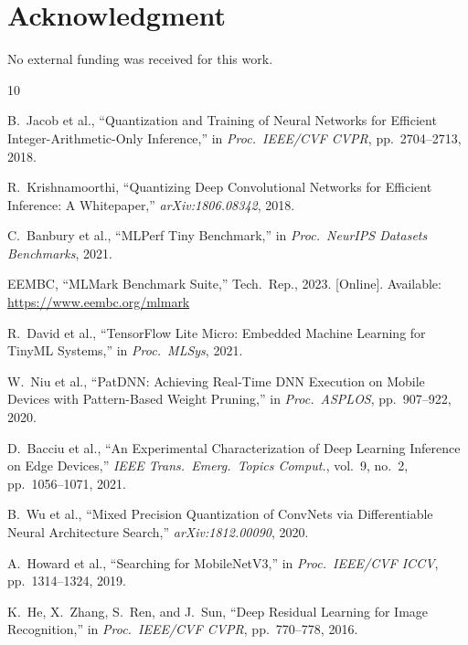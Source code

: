 \documentclass[journal]{IEEEtran}
\begin{document}
\section*{Acknowledgment}

No external funding was received for this work.

\begin{thebibliography}{10}

B.~Jacob et al., ``Quantization and Training of Neural Networks for Efficient Integer-Arithmetic-Only Inference,'' in \emph{Proc.\ IEEE/CVF CVPR}, pp.~2704--2713, 2018.

R.~Krishnamoorthi, ``Quantizing Deep Convolutional Networks for Efficient Inference: A Whitepaper,'' \emph{arXiv:1806.08342}, 2018.

C.~Banbury et al., ``MLPerf Tiny Benchmark,'' in \emph{Proc.\ NeurIPS Datasets Benchmarks}, 2021.

EEMBC, ``MLMark Benchmark Suite,'' Tech.\ Rep., 2023. [Online]. Available: \url{https://www.eembc.org/mlmark}

R.~David et al., ``TensorFlow Lite Micro: Embedded Machine Learning for TinyML Systems,'' in \emph{Proc.\ MLSys}, 2021.

W.~Niu et al., ``PatDNN: Achieving Real-Time DNN Execution on Mobile Devices with Pattern-Based Weight Pruning,'' in \emph{Proc.\ ASPLOS}, pp.~907--922, 2020.

D.~Bacciu et al., ``An Experimental Characterization of Deep Learning Inference on Edge Devices,'' \emph{IEEE Trans.\ Emerg.\ Topics Comput.}, vol.~9, no.~2, pp.~1056--1071, 2021.

B.~Wu et al., ``Mixed Precision Quantization of ConvNets via Differentiable Neural Architecture Search,'' \emph{arXiv:1812.00090}, 2020.

A.~Howard et al., ``Searching for MobileNetV3,'' in \emph{Proc.\ IEEE/CVF ICCV}, pp.~1314--1324, 2019.

K.~He, X.~Zhang, S.~Ren, and J.~Sun, ``Deep Residual Learning for Image Recognition,'' in \emph{Proc.\ IEEE/CVF CVPR}, pp.~770--778, 2016.

\end{thebibliography}
\end{document}
